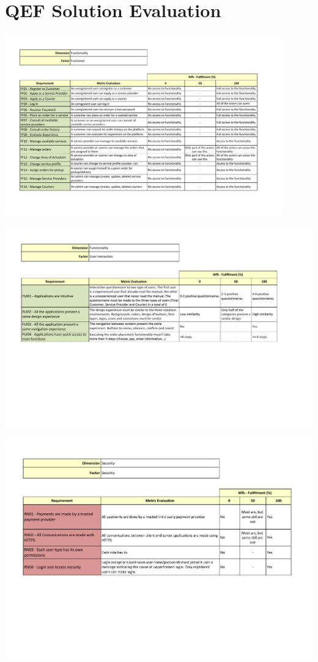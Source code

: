 \chapter{QEF Solution Evaluation} %

\label{AppendixB} 

 \includegraphics[page=1, angle=90,origin=c, width=0.9\textwidth ]{appendices/QEF/Functionality.pdf}

\pagebreak

\includegraphics[page=1, angle=90,origin=c, width=\textwidth ]{appendices/QEF/UserInteraction.pdf}

\pagebreak

\includegraphics[page=1, angle=90,origin=c, width=\textwidth ]{appendices/QEF/Security.pdf}

